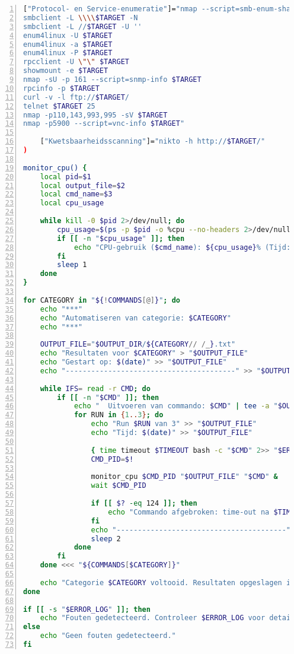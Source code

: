 \begin{lstlisting}[language=bash, basicstyle=\footnotesize\ttfamily, numbers=left, numberstyle=\tiny, breaklines=true, caption={Bash-script voor betroubaarheid}, label={lst:recon-script}]
    ["Protocol- en Service-enumeratie"]="nmap --script=smb-enum-shares.nse -p445 $TARGET
smbclient -L \\\\$TARGET -N
smbclient -L //$TARGET -U ''
enum4linux -U $TARGET
enum4linux -a $TARGET
enum4linux -P $TARGET
rpcclient -U \"\" $TARGET
showmount -e $TARGET
nmap -sU -p 161 --script=snmp-info $TARGET
rpcinfo -p $TARGET
curl -v -l ftp://$TARGET/
telnet $TARGET 25
nmap -p110,143,993,995 -sV $TARGET
nmap -p5900 --script=vnc-info $TARGET"

    ["Kwetsbaarheidsscanning"]="nikto -h http://$TARGET/"
)

monitor_cpu() {
    local pid=$1
    local output_file=$2
    local cmd_name=$3
    local cpu_usage

    while kill -0 $pid 2>/dev/null; do
        cpu_usage=$(ps -p $pid -o %cpu --no-headers 2>/dev/null)
        if [[ -n "$cpu_usage" ]]; then
            echo "CPU-gebruik ($cmd_name): ${cpu_usage}% (Tijd: $(date))" >> "$output_file"
        fi
        sleep 1
    done
}

for CATEGORY in "${!COMMANDS[@]}"; do
    echo "***"
    echo "Automatiseren van categorie: $CATEGORY"
    echo "***"

    OUTPUT_FILE="$OUTPUT_DIR/${CATEGORY// /_}.txt"
    echo "Resultaten voor $CATEGORY" > "$OUTPUT_FILE"
    echo "Gestart op: $(date)" >> "$OUTPUT_FILE"
    echo "----------------------------------------" >> "$OUTPUT_FILE"

    while IFS= read -r CMD; do
        if [[ -n "$CMD" ]]; then
            echo "  Uitvoeren van commando: $CMD" | tee -a "$OUTPUT_FILE"
            for RUN in {1..3}; do
                echo "Run $RUN van 3" >> "$OUTPUT_FILE"
                echo "Tijd: $(date)" >> "$OUTPUT_FILE"
                
                { time timeout $TIMEOUT bash -c "$CMD" 2>> "$ERROR_LOG" ; } >> "$OUTPUT_FILE" 2>&1 &
                CMD_PID=$!

                monitor_cpu $CMD_PID "$OUTPUT_FILE" "$CMD" &
                wait $CMD_PID

                if [[ $? -eq 124 ]]; then
                    echo "Commando afgebroken: time-out na $TIMEOUT seconden" | tee -a "$OUTPUT_FILE" "$ERROR_LOG"
                fi
                echo "----------------------------------------" >> "$OUTPUT_FILE"
                sleep 2
            done
        fi
    done <<< "${COMMANDS[$CATEGORY]}"

    echo "Categorie $CATEGORY voltooid. Resultaten opgeslagen in $OUTPUT_FILE"
done

if [[ -s "$ERROR_LOG" ]]; then
    echo "Fouten gedetecteerd. Controleer $ERROR_LOG voor details."
else
    echo "Geen fouten gedetecteerd."
fi
\end{lstlisting}